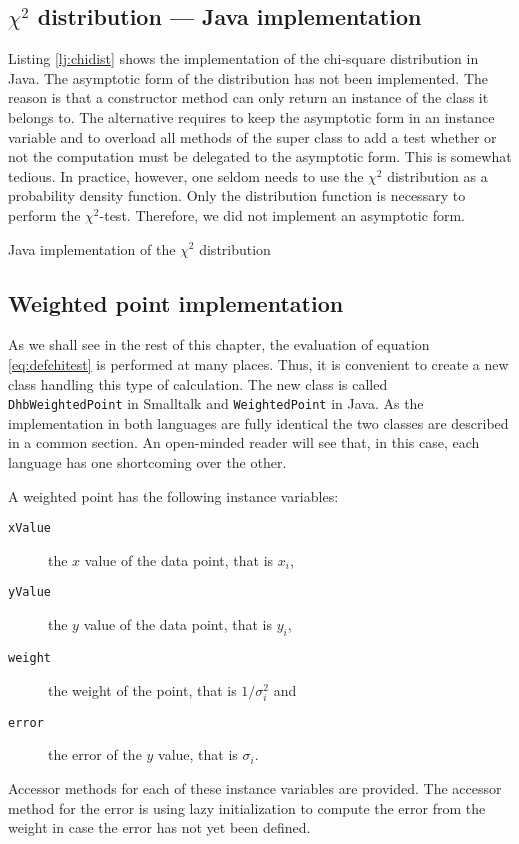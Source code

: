 \documentclass[twoside]{book}
\begin{document}
\subsection{$\chi^2$ distribution --- Java implementation}
 Listing \ref{lj:chidist} shows
the implementation of the chi-square distribution in Java. The
asymptotic form of the distribution has not been implemented. The
reason is that a constructor method can only return an instance of
the class it belongs to. The alternative requires to keep the
asymptotic form in an instance variable and to overload all
methods of the super class to add a test whether or not the
computation must be delegated to the asymptotic form. This is
somewhat tedious. In practice, however, one seldom needs to use
the $\chi^2$ distribution as a probability density function. Only
the distribution function is necessary to perform the
$\chi^2$-test. Therefore, we did not implement an asymptotic form.
\begin{listing} Java implementation of the $\chi^2$ distribution \label{lj:chidist}

\end{listing}

\subsection{Weighted point implementation}
\label{sec:weightedPoint}  As we shall see in the rest of this chapter, the
evaluation of equation \ref{eq:defchitest} is performed at many
places. Thus, it is convenient to create a new class handling this
type of calculation. The new class is called {\tt
DhbWeightedPoint} in Smalltalk and {\tt WeightedPoint} in Java. As
the implementation in both languages are fully identical the two
classes are described in a common section. An open-minded reader
will see that, in this case, each language has one shortcoming
over the other.

\noindent A weighted point has the following instance variables:
\begin{description}
  \item[\tt xValue] the $x$ value of the data point, that is $x_i$,
  \item[\tt yValue] the $y$ value of the data point, that is $y_i$,
  \item[\tt weight] the weight of the point, that is $1/\sigma_i^2$
  and
  \item[\tt error] the error of the $y$ value, that is $\sigma_i$.
\end{description}
Accessor methods for each of these instance variables are
provided. The accessor method for the error is using lazy
initialization to compute the error from the weight in case the
error has not yet been defined.
\end{document}
